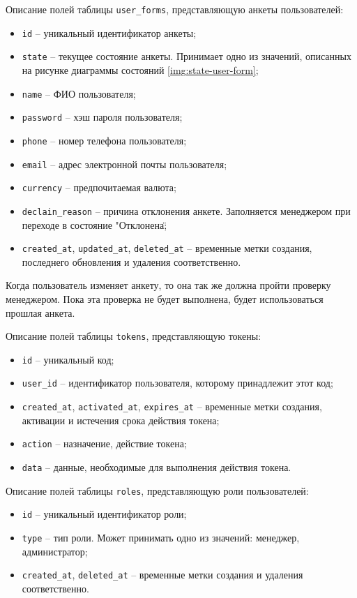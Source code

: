 Описание полей таблицы \texttt{user\_forms}, представляющую анкеты пользователей:
\begin{itemize}
    \item \texttt{id} -- уникальный идентификатор анкеты;
    \item \texttt{state} -- текущее состояние анкеты. Принимает одно из значений, описанных на рисунке диаграммы состояний \ref{img:state-user-form};
    \item \texttt{name} -- ФИО пользователя;
    \item \texttt{password} -- хэш пароля пользователя;
    \item \texttt{phone} -- номер телефона пользователя;
    \item \texttt{email} -- адрес электронной почты пользователя;
    \item \texttt{currency} -- предпочитаемая валюта;
    \item \texttt{declain\_reason} -- причина отклонения анкете. Заполняется менеджером при переходе в состояние "Отклонена\";
    \item \texttt{created\_at}, \texttt{updated\_at}, \texttt{deleted\_at} -- временные метки создания, последнего обновления и удаления соответственно.
\end{itemize}

Когда пользователь изменяет анкету, то она так же должна пройти проверку менеджером. Пока эта проверка не будет выполнена, будет использоваться прошлая анкета.

Описание полей таблицы \texttt{tokens}, представляющую токены:
\begin{itemize}
  \item \texttt{id} -- уникальный код;
  \item \texttt{user\_id} -- идентификатор пользователя, которому принадлежит этот код;
  \item \texttt{created\_at}, \texttt{activated\_at}, \texttt{expires\_at} -- временные метки создания, активации и истечения срока действия токена;
  \item \texttt{action} -- назначение, действие токена;
  \item \texttt{data} -- данные, необходимые для выполнения действия токена.
\end{itemize}

Описание полей таблицы \texttt{roles}, представляющую роли пользователей:
\begin{itemize}
    \item \texttt{id} -- уникальный идентификатор роли;
    \item \texttt{type} -- тип роли. Может принимать одно из значений: менеджер, администратор;
    \item \texttt{created\_at}, \texttt{deleted\_at} -- временные метки создания и удаления соответственно.
\end{itemize}

